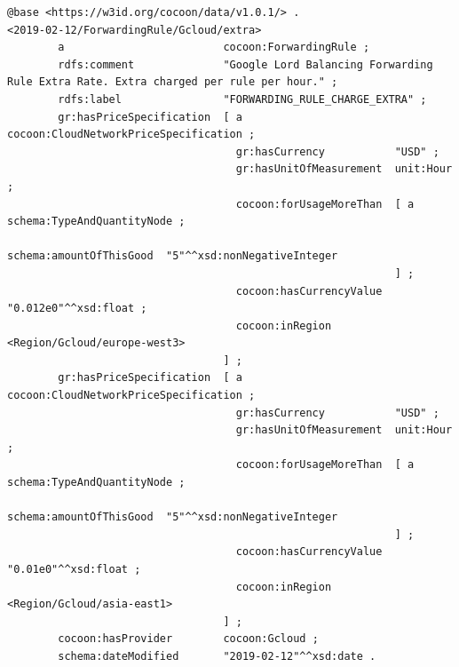 \begin{lstlisting}[caption={Price for Extra Load Balancing Rules in Google Cloud},label={lst:GoogleLoadBalancingRulesPriceSpecification}]
@base <https://w3id.org/cocoon/data/v1.0.1/> .
<2019-02-12/ForwardingRule/Gcloud/extra>
        a                         cocoon:ForwardingRule ;
        rdfs:comment              "Google Lord Balancing Forwarding Rule Extra Rate. Extra charged per rule per hour." ;
        rdfs:label                "FORWARDING_RULE_CHARGE_EXTRA" ;
        gr:hasPriceSpecification  [ a                        cocoon:CloudNetworkPriceSpecification ;
                                    gr:hasCurrency           "USD" ;
                                    gr:hasUnitOfMeasurement  unit:Hour ;
                                    cocoon:forUsageMoreThan  [ a                        schema:TypeAndQuantityNode ;
                                                               schema:amountOfThisGood  "5"^^xsd:nonNegativeInteger
                                                             ] ;
                                    cocoon:hasCurrencyValue  "0.012e0"^^xsd:float ;
                                    cocoon:inRegion          <Region/Gcloud/europe-west3>
                                  ] ;
        gr:hasPriceSpecification  [ a                        cocoon:CloudNetworkPriceSpecification ;
                                    gr:hasCurrency           "USD" ;
                                    gr:hasUnitOfMeasurement  unit:Hour ;
                                    cocoon:forUsageMoreThan  [ a                        schema:TypeAndQuantityNode ;
                                                               schema:amountOfThisGood  "5"^^xsd:nonNegativeInteger
                                                             ] ;
                                    cocoon:hasCurrencyValue  "0.01e0"^^xsd:float ;
                                    cocoon:inRegion          <Region/Gcloud/asia-east1>
                                  ] ;
        cocoon:hasProvider        cocoon:Gcloud ;
        schema:dateModified       "2019-02-12"^^xsd:date .
\end{lstlisting}

